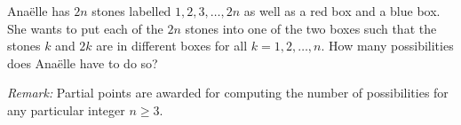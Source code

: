 Anaëlle has $2n$ stones labelled $1,2,3,\ldots,2n$ as well as a red box and a blue box.
She wants to put each of the $2n$ stones into one of the two boxes such that
the stones $k$ and $2k$ are in different boxes for all $k=1,2,\dots,n$.
How many possibilities does Anaëlle have to do so?

\emph{Remark:} Partial points are awarded for computing the number of possibilities
for any particular integer $n \geq 3$.
